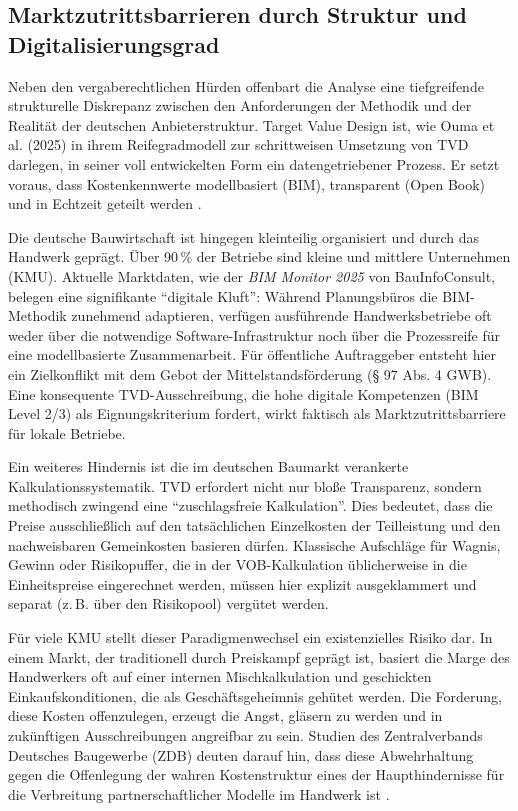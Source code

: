 \subsection{Marktzutrittsbarrieren durch Struktur und Digitalisierungsgrad}
\label{sec:5.1.3}

Neben den vergaberechtlichen Hürden offenbart die Analyse eine tiefgreifende strukturelle Diskrepanz zwischen den Anforderungen der Methodik und der Realität der deutschen Anbieterstruktur. Target Value Design ist, wie Ouma et al. (2025) in ihrem Reifegradmodell zur schrittweisen Umsetzung von \acs{TVD} darlegen, in seiner voll entwickelten Form ein datengetriebener Prozess. Er setzt voraus, dass Kostenkennwerte modellbasiert (\acs{BIM}), transparent (Open Book) und in Echtzeit geteilt werden \autocite[Vgl.][S.~206]{ouma_target_2025}.

Die deutsche Bauwirtschaft ist hingegen kleinteilig organisiert und durch das Handwerk geprägt. Über 90\,\% der Betriebe sind kleine und mittlere Unternehmen (\acs{KMU}). Aktuelle Marktdaten, wie der \textit{\acs{BIM} Monitor 2025} von BauInfoConsult, belegen eine signifikante \enquote{digitale Kluft}: Während Planungsbüros die \acs{BIM}-Methodik zunehmend adaptieren, verfügen ausführende Handwerksbetriebe oft weder über die notwendige Software-Infrastruktur noch über die Prozessreife für eine modellbasierte Zusammenarbeit. \autocite[Vgl.][]{bauinfoconsult2025}
Für öffentliche Auftraggeber entsteht hier ein Zielkonflikt mit dem Gebot der Mittelstandsförderung (§ 97 Abs. 4 GWB).\autocite[Vgl.][§~97 Abs.~4]{noauthor_gesetz_2013}
 Eine konsequente \acs{TVD}-Ausschreibung, die hohe digitale Kompetenzen (\acs{BIM} Level 2/3) als Eignungskriterium fordert, wirkt faktisch als Marktzutrittsbarriere für lokale Betriebe.

Ein weiteres Hindernis ist die im deutschen Baumarkt verankerte Kalkulationssystematik. \acs{TVD} erfordert nicht nur bloße Transparenz, sondern methodisch zwingend eine \enquote{zuschlagsfreie Kalkulation}.
Dies bedeutet, dass die Preise ausschließlich auf den tatsächlichen Einzelkosten der Teilleistung und den nachweisbaren Gemeinkosten basieren dürfen. Klassische Aufschläge für Wagnis, Gewinn oder Risikopuffer, die in der \acs{VOB}-Kalkulation üblicherweise in die Einheitspreise eingerechnet werden, müssen hier explizit ausgeklammert und separat (z.\,B. über den Risikopool) vergütet werden.

Für viele \acs{KMU} stellt dieser Paradigmenwechsel ein existenzielles Risiko dar. In einem Markt, der traditionell durch Preiskampf geprägt ist, basiert die Marge des Handwerkers oft auf einer internen Mischkalkulation und geschickten Einkaufskonditionen, die als Geschäftsgeheimnis gehütet werden. Die Forderung, diese Kosten offenzulegen, erzeugt die Angst, gläsern zu werden und in zukünftigen Ausschreibungen angreifbar zu sein. Studien des Zentralverbands Deutsches Baugewerbe (ZDB) deuten darauf hin, dass diese Abwehrhaltung gegen die Offenlegung der wahren Kostenstruktur eines der Haupthindernisse für die Verbreitung partnerschaftlicher Modelle im Handwerk ist \autocite[Vgl.][S.~37]{zdb_geschaftsbericht_2024}.

